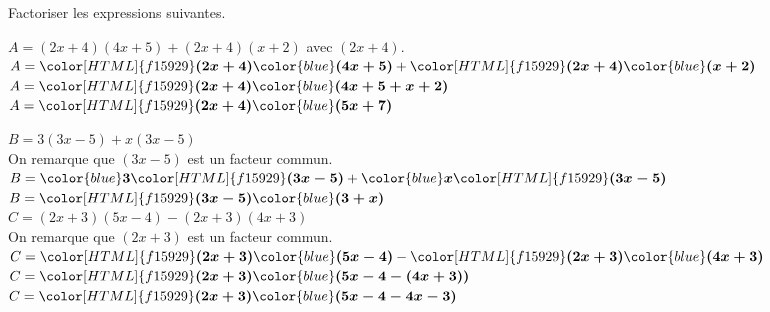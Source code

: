 \begin{corrige}
    Factoriser les expressions suivantes.
    \begin{itemize}
        \def\item{}
        \begin{spacing}{1.2}
            \item $A=(2x+4)(4x+5)+(2x+4)(x+2)$ avec $(2x+4)$.\\
            $A={\color[HTML]{f15929}\boldsymbol{(2x+4)}}{\color{blue}\boldsymbol{(4x+5)}}+{\color[HTML]{f15929}\boldsymbol{(2x+4)}}{\color{blue}\boldsymbol{(x+2)}}$\\
            $A={\color[HTML]{f15929}\boldsymbol{(2x+4)}}{\color{blue}\boldsymbol{(4x+5+x+2)}}$\\
            $A={\color[HTML]{f15929}\boldsymbol{(2x+4)}}{\color{blue}\boldsymbol{(5x+7)}}$\\
        \end{spacing}
    \end{itemize}
    \Coupe
    \begin{itemize}
        \def\item{}
        \begin{spacing}{1.2}            
            \item $B = 3(3x-5)+x(3x-5)$\\
            On remarque que $(3x-5)$ est un facteur commun.\\
            $B={\color{blue}\boldsymbol{3}}{\color[HTML]{f15929}\boldsymbol{(3x-5)}}+{\color{blue}\boldsymbol{x}}{\color[HTML]{f15929}\boldsymbol{(3x-5)}}$\\
            $B={\color[HTML]{f15929}\boldsymbol{(3x-5)}}{\color{blue}\boldsymbol{(3+x)}}$\\
            \item $C=(2x+3)(5x-4)-(2x+3)(4x+3)$\\
            On remarque que $(2x+3)$ est un facteur commun.\\
            $C={\color[HTML]{f15929}\boldsymbol{(2x+3)}}{\color{blue}\boldsymbol{(5x-4)}}-{\color[HTML]{f15929}\boldsymbol{(2x+3)}}{\color{blue}\boldsymbol{(4x+3)}}$\\
            $C={\color[HTML]{f15929}\boldsymbol{(2x+3)}}{\color{blue}\boldsymbol{(5x-4-(4x+3))}}$\\
            $C={\color[HTML]{f15929}\boldsymbol{(2x+3)}}{\color{blue}\boldsymbol{(5x-4-4x-3)}}$\\

\end{spacing}
\end{itemize}
\end{corrige}
